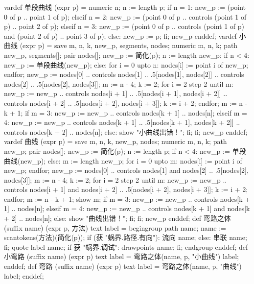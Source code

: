\startMPinclusions[+]
vardef 单段曲线 (expr p) =
  numeric n; n := length p;
  if n = 1:
    new_p := (point 0 of p .. point 1 of p);
  elseif n = 2:
    new_p := (point 0 of p .. controls (point 1 of p) .. point 2 of p);
  elseif n = 3:
    new_p := (point 0 of p .. 
        controls (point 1 of p) and (point 2 of p) 
        .. point 3 of p);
  else:
    new_p := p;
  fi;
  new_p
enddef;
vardef 小曲线 (expr p) =
  save m, n, k, new_p, segments, nodes;
  numeric m, n, k; path new_p, segments[]; pair nodes[];
  new_p := 简化(p);
  n := length new_p;
  if n < 4:
    new_p := 单段曲线(new_p);
  else:
    for i = 0 upto n:
      nodes[i] := point i of new_p;
    endfor;
    new_p := nodes[0] 
          .. controls nodes[1]
          .. .5[nodes[1], nodes[2]]
          .. controls nodes[2]
          .. .5[nodes[2], nodes[3]];
    m := n - 4;
    k := 2;
    for i = 2 step 2 until m:
      new_p := new_p
          .. controls nodes[i + 1]
          .. .5[nodes[i + 1], nodes[i + 2]]
          .. controls nodes[i + 2]
          .. .5[nodes[i + 2], nodes[i + 3]];
      k := i + 2;
    endfor;
    m := n - k + 1;
    if m = 3:
      new_p := new_p .. controls nodes[k + 1] .. nodes[n];
    elseif m = 4:
      new_p := new_p 
        .. controls nodes[k + 1]
        .. .5[nodes[k + 1], nodes[k + 2]]
        .. controls nodes[k + 2]
        .. nodes[n];
    else:
      show "小曲线出错！";
    fi;
  fi;
  new_p
enddef;
vardef 曲线 (expr p) =
  save m, n, k, new_p, nodes;
  numeric m, n, k; path new_p; pair nodes[];
  new_p := 简化(p);
  n := length p;
  if n < 4:
    new_p := 单段曲线(new_p);
  else:
    m := length new_p;
    for i = 0 upto m:
      nodes[i] := point i of new_p;
    endfor;
    new_p := nodes[0] 
      .. controls nodes[1] and nodes[2] 
      .. .5[nodes[2], nodes[3]];
    m := n - 4;
    k := 2;
    for i = 2 step 2 until m:
      new_p := new_p 
        .. controls nodes[i + 1] and nodes[i + 2] 
        .. .5[nodes[i + 2], nodes[i + 3]];
      k := i + 2;
    endfor;
    m := n - k + 1;
    show m;
    if m = 3:
      new_p := new_p .. controls nodes[k + 1] .. nodes[n];
    elseif m = 4:
      new_p := new_p 
        .. controls nodes[k + 1] and nodes[k + 2]
        .. nodes[n];
    else:
      show "曲线出错！";
    fi;
  fi;
  new_p
enddef;
def 弯路之体 (suffix name) (expr p, 方法) text label =
  begingroup
  path name; name := scantokens(方法)(简化(p));
  if (获 "蜗界.路径.有向"):
    流向 name;
  else:
    串联 name;
  fi;
  quote label name;
  if 获 "蜗界.调试": drawpoints name; fi;
  endgroup
enddef;
def 小弯路 (suffix name) (expr p) text label =
  弯路之体(name, p, "小曲线") label;
enddef;
def 弯路 (suffix name) (expr p) text label =
  弯路之体(name, p, "曲线") label;
enddef;
\stopMPinclusions

